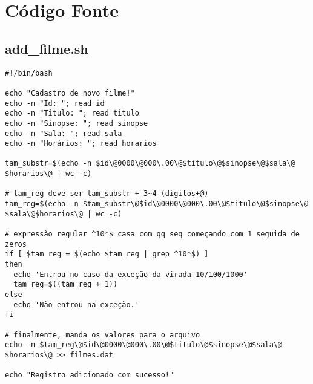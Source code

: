 \documentclass[11pt,twoside]{article}
\begin{document}
\section{Código Fonte}

\subsection{add\_filme.sh}  %
\begin{verbatim}
#!/bin/bash

echo "Cadastro de novo filme!"
echo -n "Id: "; read id
echo -n "Titulo: "; read titulo
echo -n "Sinopse: "; read sinopse
echo -n "Sala: "; read sala
echo -n "Horários: "; read horarios

tam_substr=$(echo -n $id\@0000\@000\.00\@$titulo\@$sinopse\@$sala\@
$horarios\@ | wc -c)

# tam_reg deve ser tam_substr + 3~4 (digitos+@)
tam_reg=$(echo -n $tam_substr\@$id\@0000\@000\.00\@$titulo\@$sinopse\@
$sala\@$horarios\@ | wc -c)

# expressão regular ^10*$ casa com qq seq começando com 1 seguida de zeros
if [ $tam_reg = $(echo $tam_reg | grep ^10*$) ]
then
  echo 'Entrou no caso da exceção da virada 10/100/1000'
  tam_reg=$((tam_reg + 1))
else
  echo 'Não entrou na exceção.'
fi

# finalmente, manda os valores para o arquivo
echo -n $tam_reg\@$id\@0000\@000\.00\@$titulo\@$sinopse\@$sala\@
$horarios\@ >> filmes.dat

echo "Registro adicionado com sucesso!"
\end{verbatim}


\end{document}
